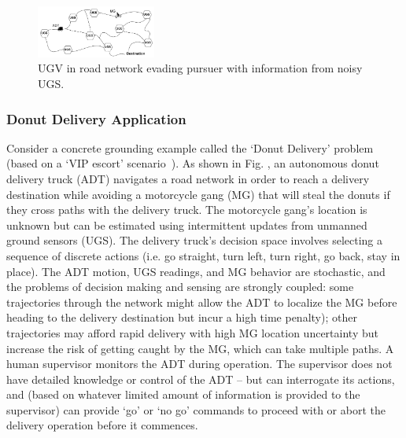 	\begin{figure}[t]%
    	\centering
     	\includegraphics[width=0.35\textwidth]{Figures/RoadNet}
    	\caption{UGV in road network evading pursuer with information from noisy UGS.} 
        \label{fig:RoadNet}
        \vspace{-0.2cm}
    \end{figure}

\subsubsection{Donut Delivery Application} \label{sec:donut_delivery}
Consider a concrete grounding example called the `Donut Delivery' problem (based on a `VIP escort' scenario~\cite{Humphrey2012-lr}). As shown in Fig. \label{fig:RoadNet} , an autonomous donut delivery truck (ADT) navigates a road network in order to reach a delivery destination while avoiding a motorcycle gang (MG) that will steal the donuts if they cross paths with the delivery truck. The motorcycle gang's location is unknown but can be estimated using intermittent updates from unmanned ground sensors (UGS). The delivery truck's decision space involves selecting a sequence of discrete actions (i.e. go straight, turn left, turn right, go back, stay in place). The ADT motion, UGS readings, and MG behavior are stochastic, and the problems of decision making and sensing are strongly coupled: some trajectories through the network might allow the ADT to localize the MG before heading to the delivery destination but incur a high time penalty); other trajectories may afford rapid delivery with high MG location uncertainty but increase the risk of getting caught by the MG, which can take multiple paths. A human supervisor monitors the ADT during operation. The supervisor does not have detailed knowledge or control of the ADT -- but can interrogate its actions, and (based on whatever limited amount of information is provided to the supervisor) can provide `go' or `no go' commands to proceed with or abort the delivery operation before it commences. 

